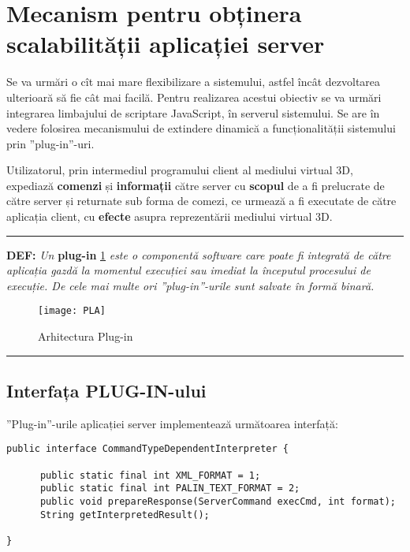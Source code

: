 \section{Mecanism pentru obținera \\ scalabilității aplicației server}

\par Se va urmări o cît mai mare flexibilizare a sistemului, astfel încât dezvoltarea ulterioară să fie cât mai facilă. Pentru realizarea acestui obiectiv se va urmări integrarea limbajului de scriptare JavaScript, în serverul sistemului. Se are în vedere folosirea mecanismului de extindere dinamică a funcționalității sistemului prin ”plug-in”-uri. 
\par Utilizatorul, prin intermediul programului client al mediului virtual 3D, expediază \textbf{comenzi} și \textbf{informații} către server cu \textbf{scopul} de a fi prelucrate de către server și returnate sub forma de comezi, ce urmează a fi executate de către aplicația client, cu \textbf{efecte} asupra reprezentării mediului virtual 3D.

\begin{center}
\rule{150mm}{.1pt}
\end{center}

\par \textbf{DEF:} \textit{Un} \textbf{plug-in} \ref{fig:imag35} \textit{este o componentă software care poate fi integrată de către aplicația gazdă la momentul execuției sau imediat la începutul procesului de execuție. De cele mai multe ori ”plug-in”-urile sunt salvate în formă binară.}

\begin{figure}[h]
    \centering
    \texttt{[image: PLA]}
    \caption{Arhitectura Plug-in}
    \label{fig:imag35}
\end{figure}

\begin{center}
\rule{150mm}{.1pt}
\end{center}

\subsection{Interfața PLUG-IN-ului}
\par ”Plug-in”-urile aplicației server implementează următoarea interfață:
\begin{verbatim}
public interface CommandTypeDependentInterpreter {
      
      public static final int XML_FORMAT = 1;
      public static final int PALIN_TEXT_FORMAT = 2;
      public void prepareResponse(ServerCommand execCmd, int format);
      String getInterpretedResult();

}
\end{verbatim}

